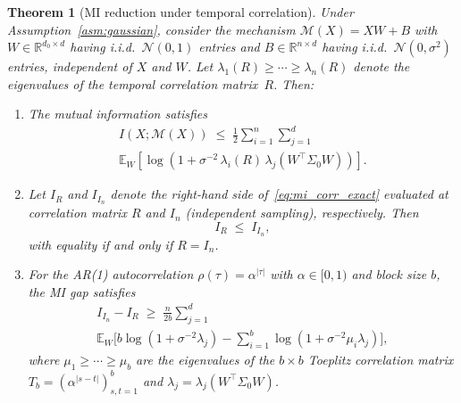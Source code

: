 \documentclass[letterpaper]{article} %
\newtheorem{theorem}{Theorem}
\begin{document}
\begin{theorem}[MI reduction under temporal correlation]
\label{thm:mi_correlation}
Under Assumption~\ref{asm:gaussian}, consider the mechanism
$\mathcal{M}(X) = XW + B$ with $W \in \mathbb{R}^{d_0 \times d}$
having i.i.d.\ $\mathcal{N}(0,1)$ entries and
$B \in \mathbb{R}^{n \times d}$ having i.i.d.\
$\mathcal{N}(0, \sigma^2)$ entries, independent of $X$ and $W$.
Let $\lambda_1(R) \ge \cdots \ge \lambda_n(R)$ denote the
eigenvalues of the temporal correlation matrix~$R$.  Then:

\begin{enumerate}[label=(\roman*)]
\item The mutual information satisfies
\begin{multline}
\label{eq:mi_corr_exact}
I(X;\mathcal{M}(X))
\;\le\;
\frac{1}{2}\sum_{i=1}^{n}\sum_{j=1}^{d}
\\
\mathbb{E}_W\!\left[
  \log\!\left(1 + \sigma^{-2}\,\lambda_i(R)\,
  \lambda_j(W^\top\!\Sigma_0 W)\right)
\right].
\end{multline}

\item Let $I_R$ and $I_{I_n}$ denote the right-hand side
of~\eqref{eq:mi_corr_exact} evaluated at correlation matrix
$R$ and $I_n$ (independent sampling), respectively.  Then
\begin{equation}
\label{eq:mi_corr_ineq}
I_R \;\le\; I_{I_n},
\end{equation}
with equality if and only if $R = I_n$.

\item For the AR(1) autocorrelation $\rho(\tau) = \alpha^{|\tau|}$
with $\alpha \in [0,1)$ and block size $b$, the MI gap satisfies
\begin{multline}
\label{eq:mi_gap_ar1}
I_{I_n} - I_R
\;\ge\;
\frac{n}{2b}\sum_{j=1}^{d}
\\
\mathbb{E}_W\!\biggl[
  b\log(1 + \sigma^{-2}\lambda_j)
  - \sum_{i=1}^{b}\log(1 + \sigma^{-2}\mu_i \lambda_j)
\biggr],
\end{multline}
where $\mu_1 \ge \cdots \ge \mu_b$ are the eigenvalues of
the $b \times b$ Toeplitz correlation matrix
$T_b = (\alpha^{|s-t|})_{s,t=1}^b$ and $\lambda_j =
\lambda_j(W^\top\!\Sigma_0 W)$.
\end{enumerate}
\end{theorem}
\end{document}
